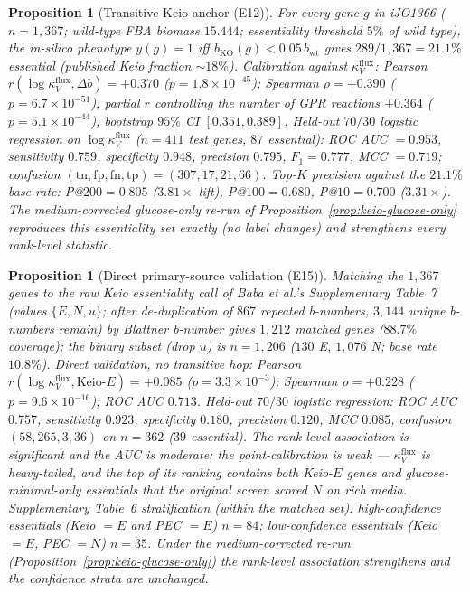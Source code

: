 \documentclass[11pt,a4paper]{article}
\theoremstyle{plain}
\newtheorem{proposition}[theorem]{Proposition}
\theoremstyle{definition}
\theoremstyle{remark}
\begin{document}
\begin{proposition}[Transitive Keio anchor (E12)]\label{prop:keio-e12}
For every gene $g$ in iJO1366 ($n=1{,}367$; wild-type FBA biomass
$15.444$; essentiality threshold $5\%$ of wild type), the
in-silico phenotype $y(g)=1$ iff $b_{\mathrm{KO}}(g)<
0.05\,b_{\mathrm{wt}}$ gives $289/1{,}367=21.1\%$ essential
(published Keio fraction $\sim18\%$). Calibration against
$\kappa^{\mathrm{flux}}_V$:
Pearson $r(\log\kappa^{\mathrm{flux}}_V,\Delta b)=+0.370$
($p=1.8\times10^{-45}$); Spearman $\rho=+0.390$
($p=6.7\times10^{-51}$); partial $r$ controlling the number of
GPR reactions $+0.364$ ($p=5.1\times10^{-44}$); bootstrap $95\%$
CI $[0.351,0.389]$. Held-out $70/30$ logistic regression on
$\log\kappa^{\mathrm{flux}}_V$ ($n=411$ test genes, $87$
essential): ROC AUC $=0.953$, sensitivity $0.759$, specificity
$0.948$, precision $0.795$, $F_1=0.777$, MCC $=0.719$; confusion
$(\mathrm{tn},\mathrm{fp},\mathrm{fn},\mathrm{tp})=
(307,17,21,66)$. Top-$K$ precision against the $21.1\%$ base rate:
P@$200=0.805$ ($3.81\times$ lift), P@$100=0.680$,
P@$10=0.700$ ($3.31\times$). The medium-corrected glucose-only
re-run of Proposition~\ref{prop:keio-glucose-only} reproduces this
essentiality set exactly (no label changes) and strengthens every
rank-level statistic.
\end{proposition}

\begin{proposition}[Direct primary-source validation (E15)]
\label{prop:keio-e15}
Matching the $1{,}367$ genes to the \emph{raw} Keio essentiality
call of Baba et al.'s Supplementary Table~7 (values
$\{E,N,u\}$; after de-duplication of $867$ repeated b-numbers,
$3{,}144$ unique b-numbers remain) by Blattner b-number gives
$1{,}212$ matched genes ($88.7\%$ coverage); the binary subset
(drop $u$) is $n=1{,}206$ ($130$ E, $1{,}076$ N; base rate
$10.8\%$). Direct validation, no transitive hop: Pearson
$r(\log\kappa^{\mathrm{flux}}_V,\mathrm{Keio}\text{-}E)=+0.085$
($p=3.3\times10^{-3}$); Spearman $\rho=+0.228$
($p=9.6\times10^{-16}$); ROC AUC $0.713$. Held-out $70/30$
logistic regression: ROC AUC $0.757$, sensitivity $0.923$,
specificity $0.180$, precision $0.120$, MCC $0.085$, confusion
$(58,265,3,36)$ on $n=362$ ($39$ essential). The rank-level
association is significant and the AUC is moderate; the
point-calibration is weak --- $\kappa^{\mathrm{flux}}_V$ is
heavy-tailed, and the top of its ranking contains both Keio-$E$
genes and glucose-minimal-only essentials that the original screen
scored $N$ on rich media. Supplementary Table~6 stratification
(within the matched set): high-confidence essentials (Keio $=E$
and PEC $=E$) $n=84$; low-confidence essentials (Keio $=E$,
PEC $=N$) $n=35$. Under the medium-corrected re-run
(Proposition~\ref{prop:keio-glucose-only}) the rank-level
association strengthens and the confidence strata are unchanged.
\end{proposition}
\end{document}
